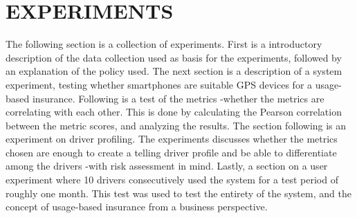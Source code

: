 \section{EXPERIMENTS}\label{sec:experiments}

The following section is a collection of experiments. First is a introductory description of the data collection used as basis for the experiments, followed by an explanation of the policy used. The next section is a description of a system experiment, testing whether smartphones are suitable GPS devices for a usage-based insurance. Following is a test of the metrics -whether the metrics are correlating with each other. This is done by calculating the Pearson correlation between the metric scores, and analyzing the results. The section following is an experiment on driver profiling. The experiments discusses whether the metrics chosen are enough to create a telling driver profile and be able to differentiate among the drivers -with risk assessment in mind. Lastly, a section on a user experiment where 10 drivers consecutively used the system for a test period of roughly one month. This test was used to test the entirety of the system, and the concept of usage-based insurance from a business perspective.




